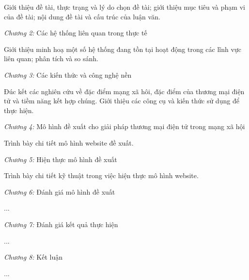 Giới thiệu đề tài, thực trạng và lý do chọn đề tài; giới thiệu mục tiêu và phạm vi của đề tài; nội dung đề tài và cấu trúc của luận văn.

\textit{Chương 2:} Các hệ thống liên quan trong thực tế

Giới thiệu minh hoạ một số hệ thống đang tồn tại hoạt động trong các lĩnh vực liên quan; phân tích và so sánh.

\textit{Chương 3:} Các kiến thức và công nghệ nền

Đúc kết các nghiên cứu về đặc điểm mạng xã hôi, đặc điểm của thương mại điện tử và tiềm năng kết hợp chúng. Giới thiệu các công cụ và kiến thức sử dụng để thực hiện.

\textit{Chương 4:} Mô hình đề xuất cho giải pháp thương mại điện tử trong mạng xã hội

Trình bày chi tiết mô hình website đề xuất.

\textit{Chương 5:} Hiện thực mô hình đề xuất

Trình bày chi tiết kỹ thuật trong việc hiện thực mô hình website.

\textit{Chương 6:} Đánh giá mô hình đề xuất

...

\textit{Chương 7:} Đánh giá kết quả thực hiện

...

\textit{Chương 8:} Kết luận

...

